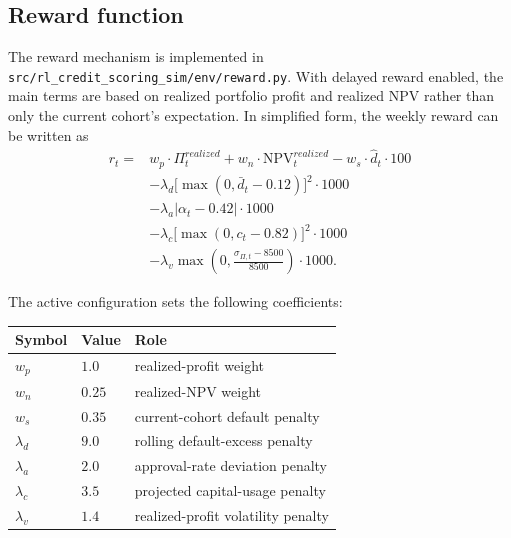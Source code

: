 \documentclass[12pt,a4paper]{article}
\begin{document}
\subsection{Reward function}

The reward mechanism is implemented in \texttt{src/rl\_credit\_scoring\_sim/env/reward.py}. With delayed reward enabled, the main terms are based on realized portfolio profit and realized NPV rather than only the current cohort's expectation. In simplified form, the weekly reward can be written as
\begin{equation}
    \label{eq:reward}
    \begin{aligned}
        r_t ={} & w_p \cdot \Pi^{realized}_t + w_n \cdot \mathrm{NPV}^{realized}_t - w_s \cdot \hat d_t \cdot 100 \\
                & - \lambda_d \bigl[\max(0, \bar d_t - 0.12)\bigr]^2 \cdot 1000                                   \\
                & - \lambda_a \left|\alpha_t - 0.42\right| \cdot 1000                                             \\
                & - \lambda_c \bigl[\max(0, c_t - 0.82)\bigr]^2 \cdot 1000                                        \\
                & - \lambda_v \max\!\left(0, \frac{\sigma_{\Pi,t} - 8500}{8500}\right) \cdot 1000.
    \end{aligned}
\end{equation}

The active configuration sets the following coefficients:

\begin{center}
    \small
    \begin{tabular}{l l l}
        \toprule
        Symbol      & Value  & Role                               \\
        \midrule
        $w_p$       & $1.0$  & realized-profit weight             \\
        $w_n$       & $0.25$ & realized-NPV weight                \\
        $w_s$       & $0.35$ & current-cohort default penalty     \\
        $\lambda_d$ & $9.0$  & rolling default-excess penalty     \\
        $\lambda_a$ & $2.0$  & approval-rate deviation penalty    \\
        $\lambda_c$ & $3.5$  & projected capital-usage penalty    \\
        $\lambda_v$ & $1.4$  & realized-profit volatility penalty \\
        \bottomrule
    \end{tabular}
\end{center}
\end{document}
